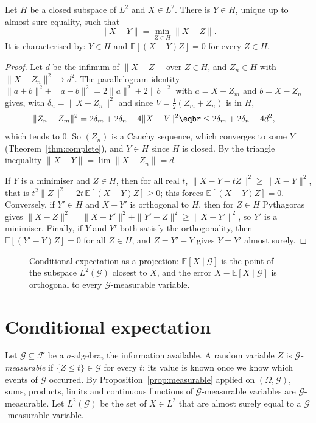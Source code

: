 \begin{theorem}\label{thm:projection}
Let $H$ be a closed subspace of $L^2$ and $X\in L^2$. There is $Y\in H$, unique up to almost sure equality, such that
\[
\|X-Y\|=\min_{Z\in H}\|X-Z\|.
\]
It is characterised by: $Y\in H$ and $\mathbb E[(X-Y)Z]=0$ for every $Z\in H$.
\end{theorem}
\begin{proof}
Let $d$ be the infimum of $\|X-Z\|$ over $Z\in H$, and $Z_n\in H$ with $\|X-Z_n\|^2\to d^2$. The parallelogram identity $\|a+b\|^2+\|a-b\|^2=2\|a\|^2+2\|b\|^2$
with $a=X-Z_m$ and $b=X-Z_n$ gives, with $\delta_n=\|X-Z_n\|^2$ and since $V=\frac12(Z_m+Z_n)$ is in $H$,
\[
\begin{aligned}\|Z_n-Z_m\|^2&=2\delta_m+2\delta_n-4\|X-V\|^2\eqbr\le2\delta_m+2\delta_n-4d^2,\end{aligned}
\]
which tends to $0$. So $(Z_n)$ is a Cauchy sequence, which converges to some $Y$ (Theorem~\ref{thm:complete}), and $Y\in H$ since $H$ is
closed. By the triangle inequality $\|X-Y\|=\lim\|X-Z_n\|=d$.

If $Y$ is a minimiser and $Z\in H$, then for all real $t$, $\|X-Y-tZ\|^2\ge\|X-Y\|^2$, that is $t^2\|Z\|^2-2t\,\mathbb E[(X-Y)Z]\ge0$; this forces $\mathbb E[(X-Y)Z]=0$.
Conversely, if $Y'\in H$ and $X-Y'$ is orthogonal to $H$, then for $Z\in H$ Pythagoras gives $\|X-Z\|^2=\|X-Y'\|^2+\|Y'-Z\|^2\ge\|X-Y'\|^2$, so $Y'$ is a
minimiser. Finally, if $Y$ and $Y'$ both satisfy the orthogonality, then $\mathbb E[(Y'-Y)Z]=0$ for all $Z\in H$, and $Z=Y'-Y$ gives $Y=Y'$ almost surely.
\end{proof}

\begin{figure}[ht]
\centering
{}
\caption{Conditional expectation as a projection: $\mathbb E[X\mid\mathcal G]$ is the point of the subspace $L^2(\mathcal G)$ closest to $X$, and
the error $X-\mathbb E[X\mid\mathcal G]$ is orthogonal to every $\mathcal G$-measurable variable.}
\label{fig:projection}
\end{figure}

\section{Conditional expectation}

Let $\mathcal G\subseteq\mathcal F$ be a $\sigma$-algebra, the information available. A random variable $Z$ is \emph{$\mathcal G$-measurable} if $\{Z\le t\}\in\mathcal G$ for every $t$:
its value is known once we know which events of $\mathcal G$ occurred. By Proposition~\ref{prop:measurable} applied on $(\Omega,\mathcal G)$, sums, products,
limits and continuous functions of $\mathcal G$-measurable variables are $\mathcal G$-measurable. Let $L^2(\mathcal G)$ be the set of $X\in L^2$ that are almost
surely equal to a $\mathcal G$-measurable variable.

